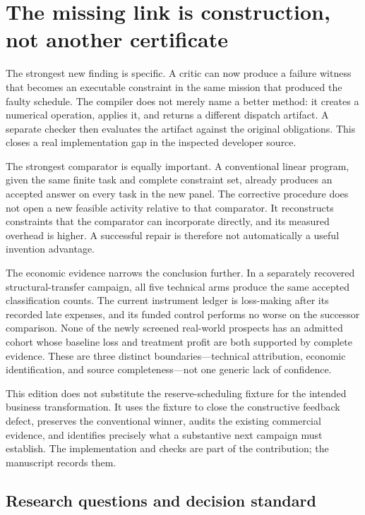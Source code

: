 \section{The missing link is construction, not another
certificate}\label{finding}

The strongest new finding is specific. A critic can now produce a
failure witness that becomes an executable constraint in the same
mission that produced the faulty schedule. The compiler does not merely
name a better method: it creates a numerical operation, applies it, and
returns a different dispatch artifact. A separate checker then evaluates
the artifact against the original obligations. This closes a real
implementation gap in the inspected developer source.

The strongest comparator is equally important. A conventional linear
program, given the same finite task and complete constraint set, already
produces an accepted answer on every task in the new panel. The
corrective procedure does not open a new feasible activity relative to
that comparator. It reconstructs constraints that the comparator can
incorporate directly, and its measured overhead is higher. A successful
repair is therefore not automatically a useful invention advantage.

The economic evidence narrows the conclusion further. In a separately
recovered structural-transfer campaign, all five technical arms produce
the same accepted classification counts. The current instrument ledger
is loss-making after its recorded late expenses, and its funded control
performs no worse on the successor comparison. None of the newly
screened real-world prospects has an admitted cohort whose baseline loss
and treatment profit are both supported by complete evidence. These are
three distinct boundaries---technical attribution, economic
identification, and source completeness---not one generic lack of
confidence.

This edition does not substitute the reserve-scheduling fixture for the
intended business transformation. It uses the fixture to close the
constructive feedback defect, preserves the conventional winner, audits
the existing commercial evidence, and identifies precisely what a
substantive next campaign must establish. The implementation and checks
are part of the contribution; the manuscript records them.

\subsection{Research questions and decision
standard}\label{research-questions-and-decision-standard}

